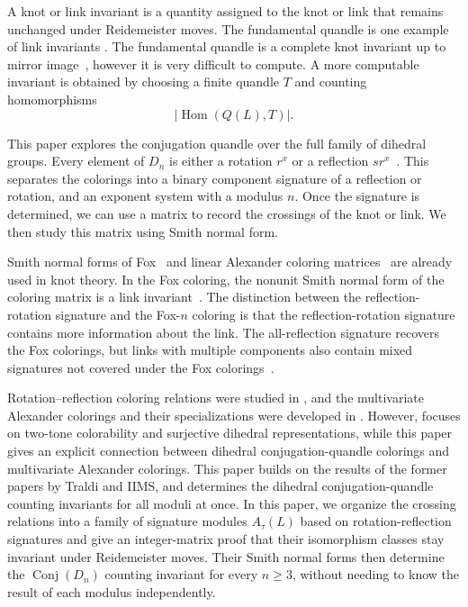 \documentclass[11pt]{article}
\theoremstyle{definition}
\begin{document}
A knot or link invariant is a quantity assigned to the knot or link that remains unchanged under Reidemeister moves. The fundamental quandle is one example of link invariants \cite{joyce,matveev}. The fundamental quandle is a complete knot invariant up to mirror image~\cite[pp.~103--104]{kamada2002}, however it is very difficult to compute. A more computable invariant is obtained by choosing a finite quandle $T$ and counting homomorphisms~\cite[p.~104]{kamada2002}
\[
\left|\operatorname{Hom}(Q(L),T)\right|.
\]

This paper explores the conjugation quandle over the full family of dihedral groups. Every element of $D_n$ is either a rotation $r^x$ or a reflection $sr^x$~\cite[Section~1.2]{dummitfoote}. This separates the colorings into a binary component signature of a reflection or rotation, and an exponent system with a modulus $n$. Once the signature is determined, we can use a matrix to record the crossings of the knot or link. We then study this matrix using Smith normal form.

Smith normal forms of Fox~\cite[Section~2.1]{ge} and linear Alexander coloring matrices~\cite[Sections~1 and~2.1]{kauffman} are already used in knot theory. In the Fox coloring, the nonunit Smith normal form of the coloring matrix is a link invariant~\cite[Section~2.1]{ge}. The distinction between the reflection-rotation signature and the Fox-$n$ coloring is that the reflection-rotation signature contains more information about the link. The all-reflection signature recovers the Fox colorings, but links with multiple components also contain mixed signatures not covered under the Fox colorings~\cite[Remark~2 and Definition~1]{IIMS2025}.

Rotation--reflection coloring relations were studied in
\cite{IIMS2025}, and the multivariate Alexander colorings and
their specializations were developed in \cite{traldi2018}.
However, \cite{IIMS2025} focuses on two-tone colorability and
surjective dihedral representations, while this paper gives
an explicit connection between dihedral conjugation-quandle
colorings and multivariate Alexander colorings. This paper
builds on the results of the former papers by Traldi and IIMS,
and determines the dihedral conjugation-quandle counting
invariants for all moduli at once. In this paper, we organize
the crossing relations into a family of signature modules
$A_\tau(L)$ based on rotation-reflection signatures and give
an integer-matrix proof that their isomorphism classes stay
invariant under Reidemeister moves. Their Smith normal forms
then determine the $\operatorname{Conj}(D_n)$ counting invariant
for every $n\geq3$, without needing to know the result of each
modulus independently.
\end{document}
